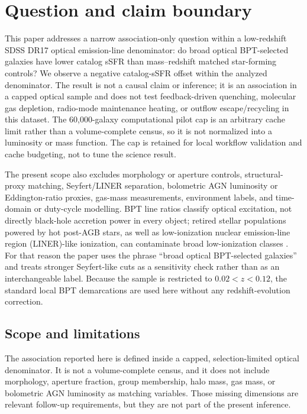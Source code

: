 \documentclass[twocolumn]{aastex631}
\begin{document}
\section{Question and claim boundary}
This paper addresses a narrow association-only question within a low-redshift SDSS DR17 optical emission-line denominator: do broad optical BPT-selected galaxies have lower catalog sSFR than mass--redshift matched star-forming controls? We observe a negative catalog-sSFR offset within the analyzed denominator. The result is not a causal claim or inference; it is an association in a capped optical sample and does not test feedback-driven quenching, molecular gas depletion, radio-mode maintenance heating, or outflow escape/recycling in this dataset. The 60,000-galaxy computational pilot cap is an arbitrary cache limit rather than a volume-complete census, so it is not normalized into a luminosity or mass function. The cap is retained for local workflow validation and cache budgeting, not to tune the science result.


The present scope also excludes morphology or aperture controls, structural-proxy matching, Seyfert/LINER separation, bolometric AGN luminosity or Eddington-ratio proxies, gas-mass measurements, environment labels, and time-domain or duty-cycle modelling. BPT line ratios classify optical excitation, not directly black-hole accretion power in every object; retired stellar populations powered by hot post-AGB stars, as well as low-ionization nuclear emission-line region (LINER)-like ionization, can contaminate broad low-ionization classes \citep{cidfernandes2011,stasinska2008,stasinska2015}. For that reason the paper uses the phrase ``broad optical BPT-selected galaxies'' and treats stronger Seyfert-like cuts as a sensitivity check rather than as an interchangeable label. Because the sample is restricted to $0.02<z<0.12$, the standard local BPT demarcations are used here without any redshift-evolution correction.

\subsection{Scope and limitations}
The association reported here is defined inside a capped, selection-limited optical denominator. It is not a volume-complete census, and it does not include morphology, aperture fraction, group membership, halo mass, gas mass, or bolometric AGN luminosity as matching variables. Those missing dimensions are relevant follow-up requirements, but they are not part of the present inference.
\end{document}
